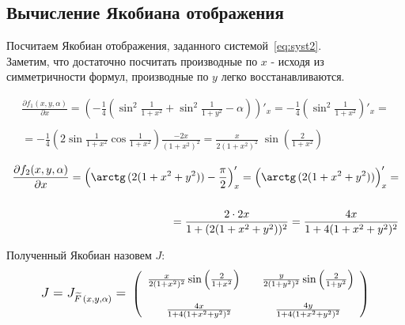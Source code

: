 \documentclass[a4paper,12pt]{article}
\begin{document}
\newpage
\subsection{Вычисление Якобиана отображения}
\par\bigskip

Посчитаем Якобиан отображения, заданного системой~\eqref{eq:syst2}. \\
Заметим, что достаточно посчитать производные по $x$ -
исходя из симметричности формул, производные по $y$ легко восстанавливаются.

\begin{equation*}\begin{split}
    \frac{\partial f_1(x, y, \alpha)}{\partial x}  = 
    \left( -\frac14 \left( \sin^2 \frac1{1+x^2} + 
    \sin^2 \frac1{1+y^2} - \alpha\right)\right)'_x =
    -\frac14 \left( \sin^2 \frac1{1+x^2}\right)'_x = \\\\ =
    -\frac14 \left( 2\sin\frac1{1+x^2}\cos\frac1{1+x^2}\right)
    \frac{-2x}{(1+x^2)^2} = 
    \frac x{2(1+x^2)^2} \; \sin\left(\frac2{1+x^2}\right) 
\end{split}\end{equation*}

\par\bigskip

\begin{equation*}\begin{split}
    \frac{\partial f_2(x, y, \alpha)}{\partial x}  = 
    \left( \arctg\,(2(1+x^2+y^2)) - \frac\pi2\right)'_x =
    \Bigl( \arctg\,(2(1+x^2+y^2))\Bigr)'_x = \\\\ =
    \frac{2\cdot2x}{1+(2(1+x^2+y^2))^2} =
    \frac{4x}{1+4(1+x^2+y^2)^2}
\end{split}\end{equation*}

\par\bigskip\par\bigskip

Полученный Якобиан назовем $J$:
\large
\begin{equation}\label{eq:jacobian}
    \text{\large$ J = J_{\widetilde{F}\,(x, y, \alpha)} = $ \normalsize}
    \left(
        \begin{array}{cc}
        \frac x{2(1+x^2)^2} \sin\left(\frac2{1+x^2}\right) \quad  &
        \frac y{2(1+y^2)^2} \sin\left(\frac2{1+y^2}\right) 
        \\
        \\
        \frac{4x}{1+4(1+x^2+y^2)^2} &
        \frac{4y}{1+4(1+x^2+y^2)^2}
    \end{array}
    \right) 
\end{equation}
\normalsize
\end{document}
